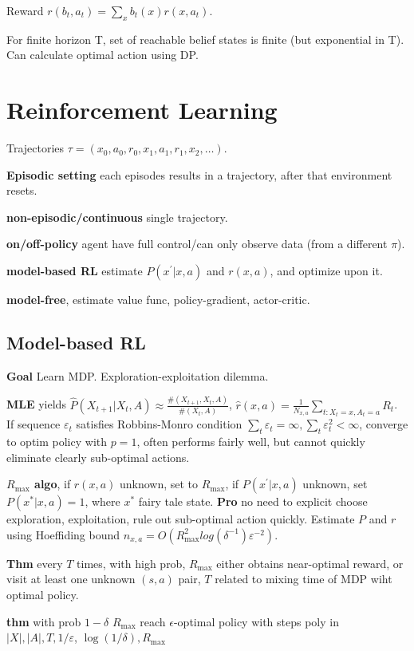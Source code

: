 Reward $r(b_t, a_t)=\sum_x b_t(x) r(x, a_t)$.

For finite horizon T, set of reachable belief states is finite (but exponential in T). Can calculate optimal action using DP.

\section{Reinforcement Learning}
Trajectories $\tau=(x_0, a_0, r_0, x_1, a_1, r_1, x_2, \ldots)$.

\textbf{Episodic setting} each episodes results in a trajectory, after that environment resets.

\textbf{non-episodic/continuous} single trajectory.

\textbf{on/off-policy} agent have full control/can only observe data (from a different $\pi$).

\textbf{model-based RL} estimate $P(x^{\prime} | x, a)$ and $r(x, a)$, and optimize upon it.

\textbf{model-free}, estimate value func, policy-gradient, actor-critic.

\subsection{Model-based RL}
\textbf{Goal} Learn MDP. Exploration-exploitation dilemma.

\textbf{MLE} yields $\hat{P}(X_{t+1} | X_t, A) \approx \frac{\#(X_{t+1}, X_t, A)}{\#(X_t, A)}$, $\hat{r}(x, a)=\frac{1}{N_{x, a}} \sum_{t: X_t=x, A_t=a} R_t$. 
If sequence $\varepsilon_t$ satisfies Robbins-Monro condition $\sum_t \varepsilon_t=\infty, \sum_t \varepsilon_t^2<\infty$, converge to optim policy with $p=1$, often performs fairly well, but cannot quickly eliminate clearly sub-optimal actions.

\textbf{$R_{\mathrm{max}}$ algo}, if $r(x, a)$ unknown, set to $R_{\mathrm{max}}$, if $P(x^{\prime} | x, a)$ unknown, set $P(x^* | x, a)=1$, where $x^{*}$ fairy tale state. 
\textbf{Pro} no need to explicit choose exploration, exploitation, rule out sub-optimal action quickly.
Estimate $P$ and $r$ using Hoeffiding bound $n_{x,a}=O(R_{\mathrm{max}}^2log(\delta^{-1})\varepsilon^{-2})$.

\textbf{Thm} every $T$ times, with high prob, $R_{\mathrm{max}}$ either obtains near-optimal reward, or visit at least one unknown $(s,a)$ pair, $T$ related to mixing time of MDP wiht optimal policy.

\textbf{thm} with prob $1-\delta$ $R_{\mathrm{max}}$ reach $\epsilon$-optimal policy with steps poly in $|X|,|A|, T, 1 / \varepsilon$, $\log (1 / \delta), R_{\max }$


